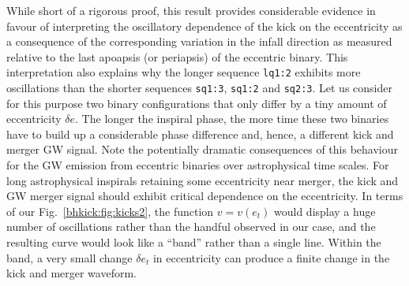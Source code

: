 While short of a rigorous proof, this result provides considerable
evidence in favour of interpreting the oscillatory dependence of the
kick on the eccentricity as a consequence of the corresponding
variation in the infall direction as measured relative to the last
apoapsis (or periapsis) of the eccentric binary. This interpretation
also explains why the longer sequence \texttt{lq1:2} exhibits more
oscillations than the shorter sequences \texttt{sq1:3}, \texttt{sq1:2}
and \texttt{sq2:3}. Let us consider for this purpose two binary
configurations that only differ by a tiny amount of eccentricity
$\delta e$. The longer the inspiral phase, the more time these two
binaries have to build up a considerable phase difference and, hence,
a different kick and merger GW signal. Note the potentially dramatic
consequences of this behaviour for the GW emission from eccentric
binaries over astrophysical time scales. For long astrophysical
inspirals retaining some eccentricity near merger,
the kick and GW merger signal should exhibit critical dependence on
the eccentricity. In terms of our Fig.~\ref{bhkick:fig:kicks2}, the function
$v=v(e_t)$ would display a huge number of oscillations rather than the
handful observed in our case, and the resulting curve would look like
a ``band'' rather than a single line. Within the band, a very small
change $\delta e_t$ in eccentricity can produce a finite change in the
kick and merger waveform.

